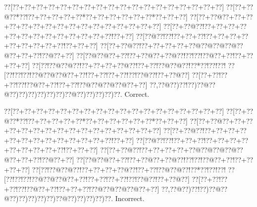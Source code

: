 \documentclass[a5paper]{article}
\begin{document}
\begin{center}
{\goo
\0??[\0??+\0??+\0??+\0??+\0??+\0??+\0??+\0??+\0??+\0??+\0??+\0??+\0??+\0??+\0??+\0??+\0??+\0??]
\0??[\0??+\0??@\0??*\0??!\0??+\0??+\0??+\0??+\0??*\0??+\0??+\0??+\0??+\0??+\0??*\0??+\0??+\0??]
\0??[\0??+\0??@\0??+\0??+\0??+\0??+\0??+\0??+\0??+\0??+\0??+\0??+\0??+\0??+\0??+\0??+\0??+\0??]
\0??[\0??+\0??@\0??!\0??+\0??+\0??+\0??+\0??+\0??+\0??+\0??+\0??+\0??+\0??+\0??+\0??!\0??+\0??]
\0??[\0??@\0??!\0??!\0??+\0??+\0??!\0??+\0??+\0??+\0??+\0??+\0??+\0??+\0??+\0??!\0??+\0??+\0??]
\0??[\0??+\0??@\0??!\0??+\0??+\0??+\0??+\0??@\0??@\0??@\0??@\0??@\0??+\0??+\0??!\0??@\0??+\0??]
\0??[\0??@\0??@\0??+\0??!\0??+\0??@\0??+\0??@\0??!\0??!\0??!\0??@\0??+\0??!\0??+\0??+\0??+\0??]
\0??[\0??!\0??@\0??@\0??!\0??+\0??+\0??+\0??@\0??!\0??+\0??!\0??@\0??@\0??!\0??*\0??!\0??!\0??!
\0??[\0??!\0??!\0??!\0??@\0??@\0??@\0??+\0??!\0??+\0??!\0??+\0??!\0??!\0??@\0??!\0??+\0??@\0??]
\0??[\0??+\0??!\0??+\0??!\0??!\0??@\0??+\0??!\0??+\0??!\0??@\0??@\0??@\0??@\0??+\0??]
\0??,\0??@\0??)\0??!\0??)\0??@\0??@\0??)\0??)\0??)\0??)\0??)\0??)\0??@\0??)\0??)\0??)\0??)\0??.
}
Correct. 

\end{center}
\begin{center}
{\goo
\0??[\0??+\0??+\0??+\0??+\0??+\0??+\0??+\0??+\0??+\0??+\0??+\0??+\0??+\0??+\0??+\0??+\0??+\0??]
\0??[\0??+\0??@\0??*\0??!\0??+\0??+\0??+\0??+\0??*\0??+\0??+\0??+\0??+\0??+\0??*\0??+\0??+\0??]
\0??[\0??+\0??@\0??+\0??+\0??+\0??+\0??+\0??+\0??+\0??+\0??+\0??+\0??+\0??+\0??+\0??+\0??+\0??]
\0??[\0??+\0??@\0??!\0??+\0??+\0??+\0??+\0??+\0??+\0??+\0??+\0??+\0??+\0??+\0??+\0??!\0??+\0??]
\0??[\0??@\0??!\0??!\0??+\0??+\0??!\0??+\0??+\0??+\0??+\0??+\0??+\0??+\0??+\0??!\0??+\0??+\0??]
\0??[\0??+\0??@\0??!\0??+\0??+\0??+\0??+\0??@\0??@\0??@\0??@\0??@\0??+\0??+\0??!\0??@\0??+\0??]
\0??[\0??@\0??@\0??+\0??!\0??+\0??@\0??+\0??@\0??!\0??!\0??!\0??@\0??+\0??!\0??+\0??+\0??+\0??]
\0??[\0??!\0??@\0??@\0??!\0??+\0??+\0??+\0??@\0??!\0??+\0??!\0??@\0??@\0??!\0??*\0??!\0??!\0??!
\0??[\0??!\0??!\0??!\0??@\0??@\0??@\0??+\0??!\0??+\0??!\0??+\0??!\0??!\0??@\0??!\0??+\0??@\0??]
\0??[\0??+\0??!\0??+\0??!\0??!\0??@\0??+\0??!\0??+\0??+\0??!\0??@\0??@\0??@\0??@\0??+\0??]
\0??,\0??@\0??)\0??!\0??)\0??@\0??@\0??)\0??)\0??)\0??)\0??)\0??@\0??)\0??)\0??)\0??)\0??.
}
Incorrect. 

\end{center}
\newpage
\end{document}
